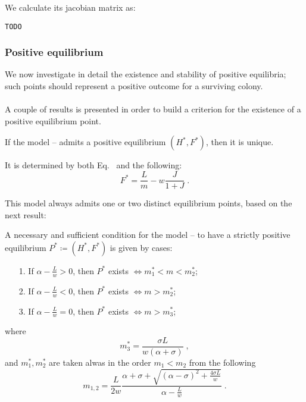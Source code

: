 We calculate its jacobian matrix as:

\texttt{TODO}  %


\subsubsection{Positive equilibrium}
We now investigate in detail the existence and stability of positive equilibria; such points should represent a positive outcome for a surviving colony.

\paragraph{}
A couple of results is presented in order to build a criterion for the existence of a positive equilibrium point.

\begin{teorema}
    If the model -- admits a positive equilibrium $(H^*, F^*)$, then it is unique.

    It is determined by both Eq.~ and the following:
    \begin{equation}
        F^* = \frac{L}{m} - w \frac{J}{1+J} \; .
        \label{eq:kh11posEqF}
    \end{equation}

    \label{teo:exUniqFstarPos}
\end{teorema}

This model always admits one or two distinct equilibrium points, based on the next result:

\begin{teorema}
    A necessary and sufficient condition for the model -- to have a strictly positive equilibrium $P^* \coloneq (H^*, F^*)$ is given by cases:
    \begin{itemize}
        \item[1.] If $\alpha - \frac{L}{w} >0$, then $P^*$ exists $\iff m_1^* < m < m_2^*$;
        \item[2.] If $\alpha - \frac{L}{w} <0$, then $P^*$ exists $\iff m > m_2^*$;
        \item[3.] If $\alpha - \frac{L}{w} =0$, then $P^*$ exists $\iff m > m_3^*$;
    \end{itemize}
    where
    \begin{equation}
        m_3^* = \frac{ \sigma L}{ w (\alpha + \sigma) } \; ,
        \label{eq:FstarPosM3}
    \end{equation}
    and $m_1^*, m_2^*$ are taken alwas in the order $m_1 < m_2$ from the following
    \begin{equation}
        m_{1,2} = \frac{L}{2w} \frac{ \alpha + \sigma + \sqrt{ {(\alpha - \sigma)}^2 +\frac{4 \sigma L}{w}  } }
        {\alpha -\frac{L}{w}} \; .
        \label{eq:FstarPosM12}
    \end{equation}

    \label{teo:esistenzPosF}
\end{teorema}

